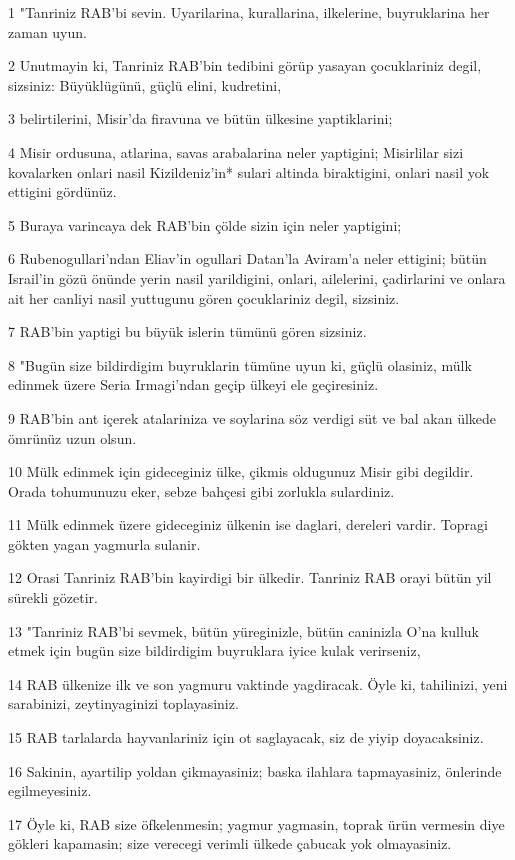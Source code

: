 \par 1 "Tanriniz RAB'bi sevin. Uyarilarina, kurallarina, ilkelerine, buyruklarina her zaman uyun.
\par 2 Unutmayin ki, Tanriniz RAB'bin tedibini görüp yasayan çocuklariniz degil, sizsiniz: Büyüklügünü, güçlü elini, kudretini,
\par 3 belirtilerini, Misir'da firavuna ve bütün ülkesine yaptiklarini;
\par 4 Misir ordusuna, atlarina, savas arabalarina neler yaptigini; Misirlilar sizi kovalarken onlari nasil Kizildeniz'in* sulari altinda biraktigini, onlari nasil yok ettigini gördünüz.
\par 5 Buraya varincaya dek RAB'bin çölde sizin için neler yaptigini;
\par 6 Rubenogullari'ndan Eliav'in ogullari Datan'la Aviram'a neler ettigini; bütün Israil'in gözü önünde yerin nasil yarildigini, onlari, ailelerini, çadirlarini ve onlara ait her canliyi nasil yuttugunu gören çocuklariniz degil, sizsiniz.
\par 7 RAB'bin yaptigi bu büyük islerin tümünü gören sizsiniz.
\par 8 "Bugün size bildirdigim buyruklarin tümüne uyun ki, güçlü olasiniz, mülk edinmek üzere Seria Irmagi'ndan geçip ülkeyi ele geçiresiniz.
\par 9 RAB'bin ant içerek atalariniza ve soylarina söz verdigi süt ve bal akan ülkede ömrünüz uzun olsun.
\par 10 Mülk edinmek için gideceginiz ülke, çikmis oldugunuz Misir gibi degildir. Orada tohumunuzu eker, sebze bahçesi gibi zorlukla sulardiniz.
\par 11 Mülk edinmek üzere gideceginiz ülkenin ise daglari, dereleri vardir. Topragi gökten yagan yagmurla sulanir.
\par 12 Orasi Tanriniz RAB'bin kayirdigi bir ülkedir. Tanriniz RAB orayi bütün yil sürekli gözetir.
\par 13 "Tanriniz RAB'bi sevmek, bütün yüreginizle, bütün caninizla O'na kulluk etmek için bugün size bildirdigim buyruklara iyice kulak verirseniz,
\par 14 RAB ülkenize ilk ve son yagmuru vaktinde yagdiracak. Öyle ki, tahilinizi, yeni sarabinizi, zeytinyaginizi toplayasiniz.
\par 15 RAB tarlalarda hayvanlariniz için ot saglayacak, siz de yiyip doyacaksiniz.
\par 16 Sakinin, ayartilip yoldan çikmayasiniz; baska ilahlara tapmayasiniz, önlerinde egilmeyesiniz.
\par 17 Öyle ki, RAB size öfkelenmesin; yagmur yagmasin, toprak ürün vermesin diye gökleri kapamasin; size verecegi verimli ülkede çabucak yok olmayasiniz.
